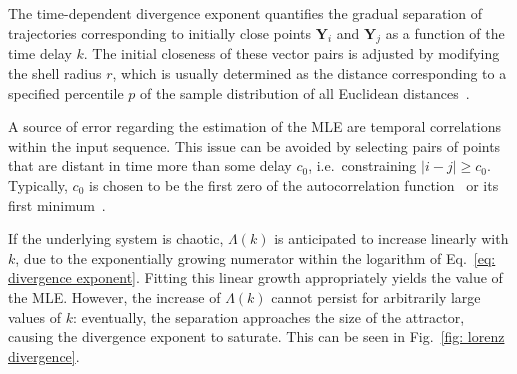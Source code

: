 The time-dependent divergence exponent quantifies the gradual separation of trajectories corresponding to initially close points $\mathbf{Y}_i$ and $\mathbf{Y}_j$ as a function of the time delay $k$. The initial closeness of these vector pairs is adjusted by modifying the shell radius $r$, which is usually determined as the distance corresponding to a specified percentile $p$ of the sample distribution of all Euclidean distances~\cite{ref:franchi2014statistical,ref:ricci2020asymptotic}.

A source of error regarding the estimation of the MLE are temporal correlations within the input sequence.
This issue can be avoided by selecting pairs of points that are distant in time more than some delay
$c_0$, i.e.\ constraining $|i-j|\geq c_0$. Typically, $c_0$ is chosen to be the first zero of the
autocorrelation function~\cite{ref:theiler1986spurious} or its first minimum~\cite{ref:albano1995kolmogorov}.

If the underlying system is chaotic, $\Lambda(k)$ is anticipated to increase linearly with $k$, due to the exponentially growing numerator within the logarithm of Eq.~\ref{eq: divergence exponent}. Fitting this linear growth appropriately yields the value of the MLE\@. However, the increase of $\Lambda(k)$ cannot persist for arbitrarily large values of $k$: eventually, the separation approaches the size of the attractor, causing the divergence exponent to saturate.
This can be seen in Fig.~\ref{fig: lorenz divergence}.

